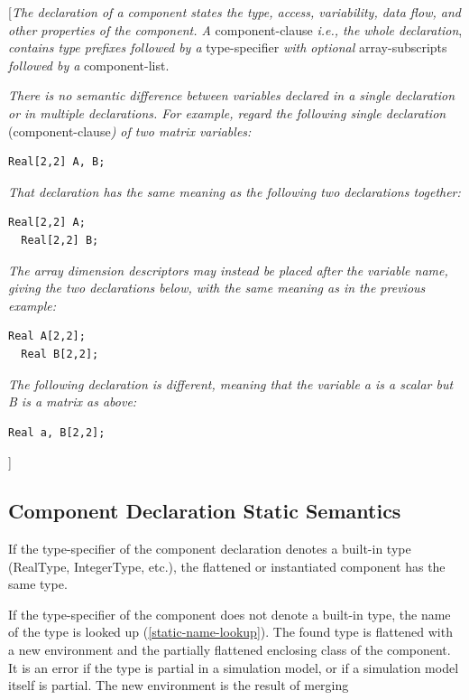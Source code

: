 \documentclass[10pt,a4paper]{report}
\def\doublelabel#1{\label{#1}}
\begin{document}
{[}\emph{The declaration of a component states the type, access,
variability, data flow, and other properties of the component. A}
component-clause \emph{i.e., the whole declaration}, \emph{contains type
prefixes followed by a} type-specifier \emph{with optional}
array-subscripts \emph{followed by a} component-list.

\emph{There is no semantic difference between variables declared in a
single declaration or in multiple declarations. For example, regard the
following single declaration} (component-clause\emph{) of two matrix
variables:}

\begin{lstlisting}[language=modelica]
  Real[2,2] A, B;
\end{lstlisting}
\emph{That declaration has the same meaning as the following two
declarations together:}

\begin{lstlisting}[language=modelica]
  Real[2,2] A;
  Real[2,2] B;
\end{lstlisting}
\emph{The array dimension descriptors may instead be placed after the
variable name, giving the two declarations below, with the same meaning
as in the previous example:}

\begin{lstlisting}[language=modelica]
  Real A[2,2];
  Real B[2,2];
\end{lstlisting}
\emph{The following declaration is different, meaning that the variable
a is a scalar but B is a matrix as above:}

\begin{lstlisting}[language=modelica]
  Real a, B[2,2];
\end{lstlisting}
{]}

\subsection{Component Declaration Static Semantics}\doublelabel{component-declaration-static-semantics}

If the type-specifier of the component declaration denotes a built-in
type (RealType, IntegerType, etc.), the flattened or instantiated
component has the same type.

If the type-specifier of the component does not denote a built-in type,
the name of the type is looked up (\ref{static-name-lookup}). The found type is
flattened with a new environment and the partially flattened enclosing
class of the component. It is an error if the type is partial in a
simulation model, or if a simulation model itself is partial. The new
environment is the result of merging
\end{document}
